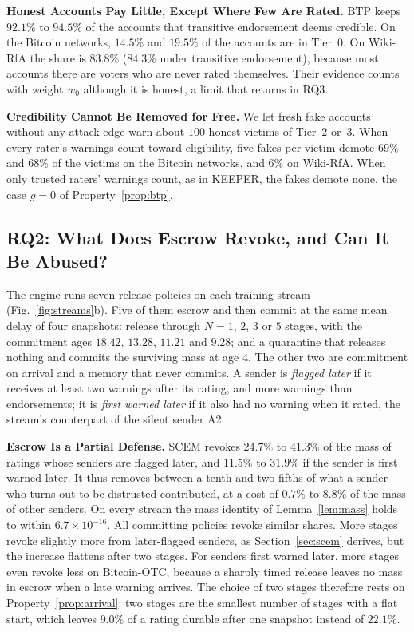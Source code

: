\documentclass[lettersize,journal]{IEEEtran}
\begin{document}
\smallskip\noindent\textbf{Honest Accounts Pay Little, Except Where Few Are Rated.}
BTP keeps $92.1\%$ to $94.5\%$ of the accounts that transitive endorsement deems credible.
On the Bitcoin networks, $14.5\%$ and $19.5\%$ of the accounts are in Tier~$0$.
On Wiki-RfA the share is $83.8\%$ ($84.3\%$ under transitive endorsement), because most accounts there are voters who are never rated themselves.
Their evidence counts with weight $w_0$ although it is honest, a limit that returns in RQ3.

\smallskip\noindent\textbf{Credibility Cannot Be Removed for Free.}
We let fresh fake accounts without any attack edge warn about $100$ honest victims of Tier~$2$ or~$3$.
When every rater's warnings count toward eligibility, five fakes per victim demote $69\%$ and $68\%$ of the victims on the Bitcoin networks, and $6\%$ on Wiki-RfA.
When only trusted raters' warnings count, as in KEEPER, the fakes demote none, the case $g = 0$ of Property~\ref{prop:btp}.

\subsection{RQ2: What Does Escrow Revoke, and Can It Be Abused?}
\label{subsec:results_scem}

The engine runs seven release policies on each training stream (Fig.~\ref{fig:streams}b).
Five of them escrow and then commit at the same mean delay of four snapshots: release through $N = 1$, $2$, $3$ or $5$ stages, with the commitment ages $18.42$, $13.28$, $11.21$ and $9.28$; and a quarantine that releases nothing and commits the surviving mass at age $4$.
The other two are commitment on arrival and a memory that never commits.
A sender is \emph{flagged later} if it receives at least two warnings after its rating, and more warnings than endorsements; it is \emph{first warned later} if it also had no warning when it rated, the stream's counterpart of the silent sender A2.

\smallskip\noindent\textbf{Escrow Is a Partial Defense.}
SCEM revokes $24.7\%$ to $41.3\%$ of the mass of ratings whose senders are flagged later, and $11.5\%$ to $31.9\%$ if the sender is first warned later.
It thus removes between a tenth and two fifths of what a sender who turns out to be distrusted contributed, at a cost of $0.7\%$ to $8.8\%$ of the mass of other senders.
On every stream the mass identity of Lemma~\ref{lem:mass} holds to within $6.7 \times 10^{-16}$.
All committing policies revoke similar shares.
More stages revoke slightly more from later-flagged senders, as Section~\ref{sec:scem} derives, but the increase flattens after two stages. For senders first warned later, more stages even revoke less on Bitcoin-OTC, because a sharply timed release leaves no mass in escrow when a late warning arrives.
The choice of two stages therefore rests on Property~\ref{prop:arrival}: two stages are the smallest number of stages with a flat start, which leaves $9.0\%$ of a rating durable after one snapshot instead of $22.1\%$.
\end{document}
